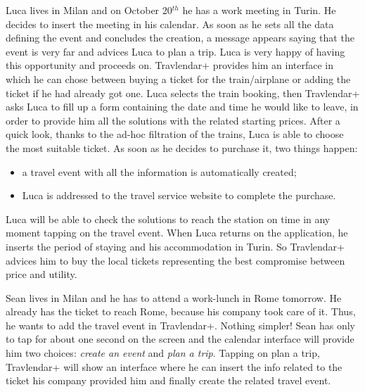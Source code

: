 Luca lives in Milan and on October 20$^{th}$ he has a work meeting in Turin. He decides to insert the meeting in his calendar. As soon as he sets all the data defining the event and concludes the creation, a message appears saying that the event is very far and advices Luca to plan a trip. Luca is very happy of having this opportunity and proceeds on. Travlendar+ provides him an interface in which he can chose between buying a ticket for the train/airplane or adding the ticket if he had already got one. Luca selects the train booking, then Travlendar+ asks Luca to fill up a form containing the date and time he would like to leave, in order to provide him all the solutions with the related starting prices. After a quick look, thanks to the ad-hoc filtration of the trains, Luca is able to choose the most suitable ticket. As soon as he decides to purchase it, two things happen: 
\begin{itemize}
	\setlength{\leftskip}{0.5cm}
	\item a travel event with all the information is automatically created;
	\item Luca is addressed to the travel service website to complete the purchase.
\end{itemize}
Luca will be able to check the solutions to reach the station on time in any moment tapping on the travel event.
When Luca returns on the application, he inserts the period of staying and his accommodation in Turin. So Travlendar+ advices him to buy the local tickets representing the best compromise between price and utility.

Sean lives in Milan and he has to attend a work-lunch in Rome tomorrow. He already has the ticket to reach Rome, because his company took care of it. Thus, he wants to add the travel event in Travlendar+. Nothing simpler! Sean has only to tap for about one second on the screen and the calendar interface will provide him two choices: \emph{create an event} and \emph{plan a trip}. Tapping on plan a trip, Travlendar+ will show an interface where he can insert the info related to the ticket his company provided him and finally create the related travel event.

